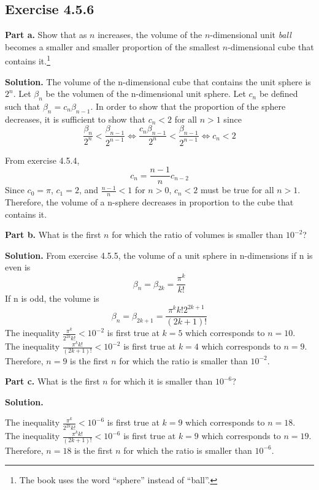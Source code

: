 \documentclass{article}
\begin{document}
\newpage

\subsection*{Exercise 4.5.6}
\textbf{Part a.}
Show that as $n$ increases, the volume of the $n$-dimensional unit \emph{ball} becomes a smaller and smaller proportion of the smallest $n$-dimensional cube that contains it.\footnote{The book uses the word ``sphere'' instead of ``ball''.}
\medskip 

\textbf{Solution.}
The volume of the n-dimensional cube that contains the unit sphere is $2^n$.
Let $\beta_n$ be the volumen of the n-dimensional unit sphere.
Let $c_n$ be defined such that $\beta_{n} = c_n\beta_{n-1}$.
In order to show that the proportion of the sphere decreases,
it is sufficient to show that $c_n < 2$ for all $n>1$ since
\[
    \frac{\beta_n}{2^n} < \frac{\beta_{n-1}}{2^{n-1}}
    \iff \frac{c_n\beta_{n-1}}{2^n} < \frac{\beta_{n-1}}{2^{n-1}}
    \iff c_n < 2
\]

From exercise 4.5.4, 
\[
    c_n = \frac{n-1}{n} c_{n-2}
\]
Since $c_0 = \pi$, $c_1 = 2$, and $\frac{n-1}{n} < 1$ for $n>0$,
$c_n < 2$ must be true for all $n>1$.
Therefore, the volume of a n-sphere decreases 
in proportion to the cube that contains it.
\bigskip 

\noindent \textbf{Part b.}
What is the first $n$ for which the ratio of volumes is smaller than $10^{-2}$?
\medskip 

\textbf{Solution.}
From exercise 4.5.5,
the volume of a unit sphere in n-dimensions 
if n is even is 
\[
    \beta_n = \beta_{2k}
    = \frac{\pi^k}{k!} 
\] 
If n is odd, the volume is 
\[
    \beta_n = \beta_{2k+1}
    = \frac{\pi^k k! 2^{2k+1}}{(2k+1)!} 
\] 
The inequality $\frac{\pi^k}{2^{2k} k!} < 10^{-2}$ is first true at $k=5$
which corresponds to $n=10$. \\
The inequality $\frac{\pi^k k!}{(2k+1)!} < 10^{-2}$ is first true at $k=4$
which corresponds to $n=9$. \\
Therefore, $n=9$ is the first $n$ for which the ratio is smaller than $10^{-2}$.
\bigskip 

\noindent \textbf{Part c.}
What is the first $n$ for which it is smaller than $10^{-6}$?
\medskip 

\textbf{Solution.}

The inequality $\frac{\pi^k}{2^{2k} k!} < 10^{-6}$ is first true at $k=9$
which corresponds to $n=18$. \\
The inequality $\frac{\pi^k k!}{(2k+1)!} < 10^{-6}$ is first true at $k=9$
which corresponds to $n=19$. \\
Therefore, $n=18$ is the first $n$ for which the ratio is smaller than $10^{-6}$.
\newpage
\end{document}

